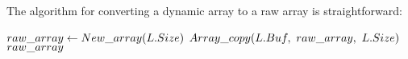 \HdrDynArrayImpl

The algorithm for converting a dynamic array to a raw array is straightforward:

\begin{algorithm}
	\begin{algorithmic}
		\Function{$\FuncToArray$}{$\VarList$}
			\State $raw\_array \gets New\_array(L.Size)$
			\State $\FuncArrayCopy(\VarList.\FieldBuffer,\ \LclRawArray,\ \VarList.\FieldSize)$
			\State \Return $raw\_array$
		\EndFunction
	\end{algorithmic}
\end{algorithm}